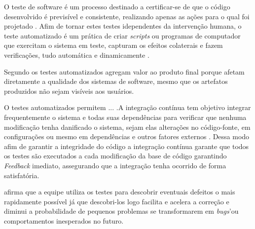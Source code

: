 O teste de software é um processo destinado a certificar-se de que o código desenvolvido é previsível e consistente, realizando apenas as ações para o qual foi projetado \cite{myers2011art}. Afim de tornar estes testes idependentes da intervenção humana, o teste automatizado é um prática de criar \textit{scripts} ou programas de computador que exercitam o sistema em teste, capturam os efeitos colaterais e fazem verificações, tudo automática e dinamicamente \cite{meszaros2007xunit}.

Segundo  os testes automatizados agregam valor ao produto final porque afetam diretamente a qualidade dos sistemas de software, mesmo que os artefatos produzidos não sejam visíveis aos usuários.

O testes automatizados permitem ... .A integração contínua tem objetivo integrar frequentemente o sistema e todas suas dependências para verificar que nenhuma modificação tenha danificado o sistema, sejam elas alterações no código-fonte, em configurações ou mesmo em dependências e outros fatores externos \cite{duvall2007continuous}. Dessa modo afim de garantir a integridade do código a integração contínua garante que todos os testes são executados a cada modificação da base de código garantindo \textit{Feedback} imediato, assegurando que a integração tenha ocorrido de forma satisfatória.

 afirma que a equipe utiliza os testes para descobrir eventuais defeitos o mais rapidamente possível já que descobri-los logo facilita e acelera a correção e diminui a probabilidade de pequenos problemas se transformarem em \textit{bugs}'ou comportamentos inesperados no futuro.

